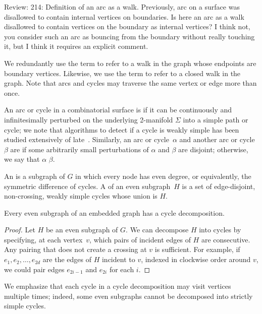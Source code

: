 \documentclass[letterpaper,review]{siamart190516}
\def\rnote#1{\color{red}Review: #1 \color{black}}
\begin{document}
\rnote{214: Definition of an arc as a walk. Previously, arc on a surface was disallowed to contain internal vertices on boundaries. Is here an arc as a walk disallowed to contain vertices on the boundary as internal vertices? I think not, you consider such an arc as bouncing from the boundary without really touching it, but I think it requires an explicit comment. }

We redundantly use the term  to refer to a walk in the graph whose endpoints are boundary vertices.  Likewise, we use the term  to refer to a closed walk in the graph.  Note that arcs and cycles may traverse the same vertex or edge more than once.

An arc or cycle in a combinatorial surface is  if it can be continuously and
infinitesimally perturbed on the underlying 2-manifold $\Sigma$ into a simple path or cycle; we note that algorithms to detect if a cycle is weakly simple has been studied extensively of late~\cite{cex-dwsp-15,aaet-rwsp-17}.
Similarly, an arc or cycle~$\alpha$ and another arc or cycle $\beta$ are  if some arbitrarily small perturbations of $\alpha$ and $\beta$ are disjoint; otherwise, we say that $\alpha$  $\beta$.

An  is a subgraph of $G$ in which every node has even degree, or equivalently, the symmetric difference of cycles.
A  of an even subgraph~$H$ is a set of edge-disjoint, non-crossing, weakly simple cycles whose union is $H$.

\begin{lemma}
\label{lem:decomposition}
Every even subgraph of an embedded graph has a cycle decomposition.
\end{lemma}

\begin{proof}
Let $H$ be an even subgraph of $G$.  We can decompose $H$ into cycles by specifying, at each vertex~$v$, which pairs of incident edges of $H$ are consecutive.  Any pairing that does not create a crossing at $v$ is sufficient.  For example, if $e_1, e_2, \dots, e_{2d}$ are the edges of $H$ incident to $v$, indexed in clockwise order around $v$, we could pair edges $e_{2i-1}$ and $e_{2i}$ for each $i$.
\end{proof}

We emphasize that each cycle in a cycle decomposition may visit vertices multiple times; indeed, some even subgraphs cannot be decomposed into strictly simple cycles.
\end{document}
